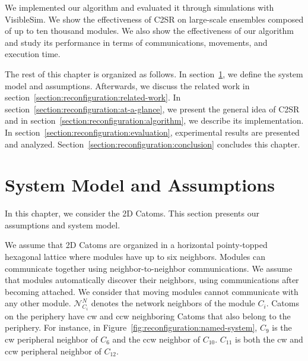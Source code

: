We implemented our algorithm and evaluated it through simulations with VisibleSim. We show the effectiveness of C2SR on large-scale ensembles composed of up to ten thousand modules. We also show the effectiveness of our algorithm and study its performance in terms of communications, movements, and execution time.

The rest of this chapter is organized as follows. In section~\ref{section:reconfiguration:model}, we define the system model and assumptions. Afterwards, we discuss the related work in section~\ref{section:reconfiguration:related-work}. In section~\ref{section:reconfiguration:at-a-glance}, we present the general idea of C2SR and in section~\ref{section:reconfiguration:algorithm}, we describe its implementation. In section~\ref{section:reconfiguration:evaluation}, experimental results are presented and analyzed. Section~\ref{section:reconfiguration:conclusion} concludes this chapter. 

\section{System Model and Assumptions}
\label{section:reconfiguration:model}

In this chapter, we consider the 2D Catoms. This section presents our assumptions and system model.

We assume that 2D Catoms are organized in a horizontal pointy-topped hexagonal lattice where modules have up to six neighbors. Modules can communicate together using neighbor-to-neighbor communications. We assume that modules automatically discover their neighbors, using communications after becoming attached. We consider that moving modules cannot communicate with any other module. $\mathcal{N}^{N}_{C_i}$ denotes the network neighbors of the module $C_i$. Catoms on the periphery have \acrfull{cw} and \acrfull{ccw} neighboring Catoms that also belong to the periphery. For instance, in Figure~\ref{fig:reconfiguration:named-system}, $C_9$ is the \gls{cw} peripheral neighbor of $C_6$ and the \gls{ccw} neighbor of $C_{10}$. $C_{11}$ is both the \gls{cw} and \gls{ccw} peripheral neighbor of $C_{12}$.

